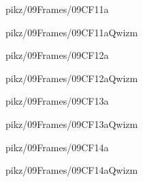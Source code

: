 \documentclass[9pt,xcolor={svgnames, x11names}]{beamer}
\begin{document}

\begin{frame}{pikz/09Frames/09CF11a}
  
\end{frame}

\begin{frame}{pikz/09Frames/09CF11aQwizm}
  
\end{frame}


\begin{frame}{pikz/09Frames/09CF12a}
  
\end{frame}


\begin{frame}{pikz/09Frames/09CF12aQwizm}
  
\end{frame}


\begin{frame}{pikz/09Frames/09CF13a}
  
\end{frame}


\begin{frame}{pikz/09Frames/09CF13aQwizm}
  
\end{frame}


\begin{frame}{pikz/09Frames/09CF14a}
  
\end{frame}


\begin{frame}{pikz/09Frames/09CF14aQwizm}
  
\end{frame}
\end{document}
